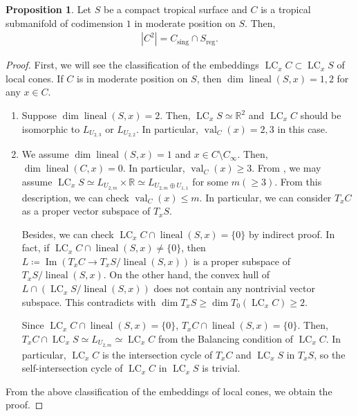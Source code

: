\documentclass[a4paper,dvipdfmx,reqno,12pt]{amsart}
\theoremstyle{definition}
\newtheorem{proposition}[theorem]{Proposition}
\newcommand{\deq}{\coloneqq}
\newcommand{\opn}[1]{\operatorname{#1}}
\numberwithin{equation}{section}
\begin{document}
\begin{proposition}
\label{proposition-self-intersection}
Let $S$ be a compact tropical surface
and $C$ is a tropical submanifold of codimension $1$
in moderate position on $S$. Then, 
\begin{align}
     |C^2|= C_{\mathrm{sing}}\cap S_{\mathrm{reg}}.
\end{align} 
\end{proposition}
\begin{proof}
First, we will see the classification of
the embeddings
$\opn{LC}_x C \subset \opn{LC}_x S$ of local cones.
If $C$ is in moderate position on $S$, then
$\dim \opn{lineal}(S,x)=1,2$ for any $x\in C$.
\begin{enumerate}[align=left,leftmargin=*]
\item Suppose $\dim \opn{lineal}(S,x)=2$.
Then, $\opn{LC}_x S\simeq \mathbb{R}^2$ and
$\opn{LC}_x C$ should be isomorphic to 
$L_{U_{2,3}}$ or $L_{U_{2,2}}$. 
In particular, $\opn{val}_C(x)=2,3$ in this case.
\item We assume $\dim \opn{lineal}(S,x)=1$ and
$x\in C\setminus C_{\infty}$. 
Then, $\dim \opn{lineal}(C,x)=0$.
In particular, $\opn{val}_C(x)\geq 3$.
From \cite[Corollary 2.4]{shaw2015tropical}, 
we may assume $\opn{LC}_x S\simeq L_{U_{2,m}}\times \mathbb{R}
\simeq L_{U_{2,m}\oplus U_{1,1}}$
for some $m(\geq 3)$.
From this description, we can check $\opn{val}_C(x)\leq m$.
In particular, we can consider $T_x C$ as 
a proper vector subspace of $T_x S$.



Besides, we can check 
$\opn{LC}_x C\cap \opn{lineal}(S,x)=\{0\}$
by indirect proof.
In fact, if $\opn{LC}_x C\cap \opn{lineal}(S,x)\ne \{0\}$,
then $L\deq \opn{Im} (T_x C\to T_x S/\opn{lineal}(S,x))$ is a
proper subspace of $T_x S/\opn{lineal}(S,x)$.
On the other hand,
the convex hull of 
$L\cap (\opn{LC}_x S/\opn{lineal}(S,x))$
does not contain any nontrivial vector subspace.
This contradicts with $\dim T_x S\geq \dim T_0(\opn{LC}_x C)\geq 2$.

Since $\opn{LC}_x C\cap \opn{lineal}(S,x)=\{0\}$,
$T_x C\cap \opn{lineal}(S,x)=\{0\}$. Then,
$T_x C\cap \opn{LC}_x S\simeq L_{U_{2,m}}\simeq \opn{LC}_x C$
from the Balancing condition of $\opn{LC}_x C$.
In particular, $\opn{LC}_x C$ is the intersection cycle of
$T_x C$ and $\opn{LC}_x S$ in $T_x S$, so the self-intersection cycle
of $\opn{LC}_x C$ in $\opn{LC}_x S$ is trivial.
\end{enumerate}
From the above classification of the embeddings
of local cones, we obtain the proof. 

\end{proof}
\end{document}
